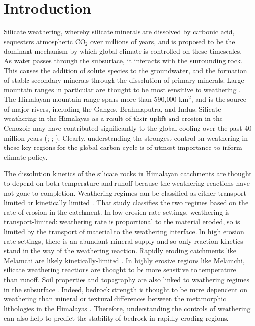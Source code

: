 
\section{Introduction}

Silicate weathering, whereby silicate minerals are dissolved by carbonic acid, sequesters atmospheric CO$_2$ over millions of years, and is proposed to be the dominant mechanism by which global climate is controlled on these timescales. As water passes through the subsurface, it interacts with the surrounding rock. This causes the addition of solute species to the groundwater, and the formation of stable secondary minerals through the dissolution of primary minerals. Large mountain ranges in particular are thought to be most sensitive to weathering \parencite{tipperShortTermClimatic2006}. The Himalayan mountain range spans more than 590,000 km$^2$, and is the source of major rivers, including the Ganges, Brahmaputra, and Indus. Silicate weathering in the Himalayas as a result of their uplift and erosion in the Cenozoic may have contributed significantly to the global cooling over the past 40 million years (\cite{raymoTectonicForcingLate1992}; \cite{westTectonicClimaticControls2005}; \cite{kumpChemicalWeatheringAtmospheric2000}). Clearly, understanding the strongest control on weathering in these key regions for the global carbon cycle is of utmost importance to inform climate policy.

\bsk

The dissolution kinetics of the silicate rocks in Himalayan catchments are thought to depend on both temperature and runoff because the weathering reactions have not gone to completion.  Weathering regimes can be classified as either transport-limited or kinetically limited \parencite{westTectonicClimaticControls2005}. That study classifies the two regimes based on the rate of erosion in the catchment. In low erosion rate settings, weathering is transport-limited: weathering rate is proportional to the material eroded, so is limited by the transport of material to the weathering interface. In high erosion rate settings, there is an abundant mineral supply and so only reaction kinetics stand in the way of the weathering reaction. Rapidly eroding catchments like Melamchi are likely kinetically-limited \parencite{stallardGeochemistryAmazonInfluence1983}. In highly erosive regions like Melamchi, silicate weathering reactions are thought to be more sensitive to temperature than runoff. Soil properties and topography are also linked to weathering regimes in the subsurface \parencite{pedrazasRelationshipTopographyBedrock2021}. Indeed, bedrock strength is thought to be more dependent on weathering than mineral or textural differences between the metamorphic lithologies in the Himalayas \parencite{medwedeffSurfaceGeomechanicalProperties2022}. Therefore, understanding the controls of weathering can also help to predict the stability of bedrock in rapidly eroding regions. 

